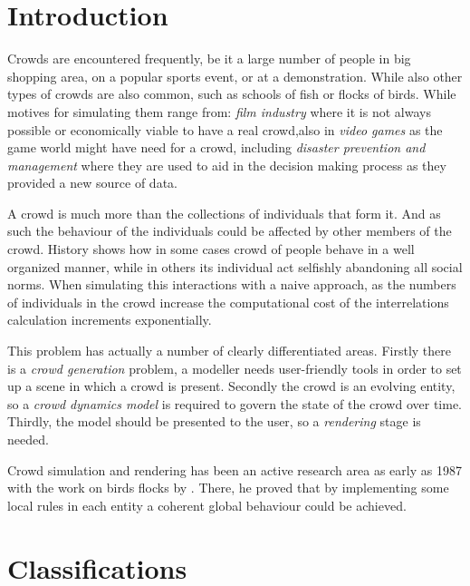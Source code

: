 \documentclass[11pt]{article}
\begin{document}
\begin{multicols}{2}

\section{Introduction}
\label{intro}

Crowds are encountered frequently, be it a large number of people in big shopping area, on a popular sports event, or at a demonstration.
While also other types of crowds are also common, such as schools of fish or flocks of birds.
While motives for simulating them range from: \textit{film industry} where it is not always possible or economically viable to have a real crowd,also in \textit{video games} as the game world might have need for a crowd, including \textit{disaster prevention and management} where they are used to aid in the decision making process as they provided a new source of data.

A crowd is much more than the collections of individuals that form it.
And as such the behaviour of the individuals could be affected by other members of the crowd.
History shows how in some cases crowd of people behave in a well organized manner, while in others its individual act selfishly abandoning all social norms.
When simulating this interactions with a naive approach, as the numbers of individuals in the crowd increase the computational cost of the interrelations calculation increments exponentially.

This problem has actually a number of clearly differentiated areas.
Firstly there is a \textit{crowd generation} problem, a modeller needs user-friendly tools in order to set up a scene in which a crowd is present.
Secondly the crowd is an evolving entity, so a \textit{crowd dynamics model} is required to govern the state of the crowd over time.
Thirdly, the model should be presented to the user, so a \textit{rendering} stage is needed.

Crowd simulation and rendering has been an active research area as early as 1987 with the work on birds flocks by \cite{Reynolds1987}.
There, he proved that by implementing some local rules in each entity a coherent global behaviour could be achieved.

\section{Classifications}


\end{multicols}
\end{document}
